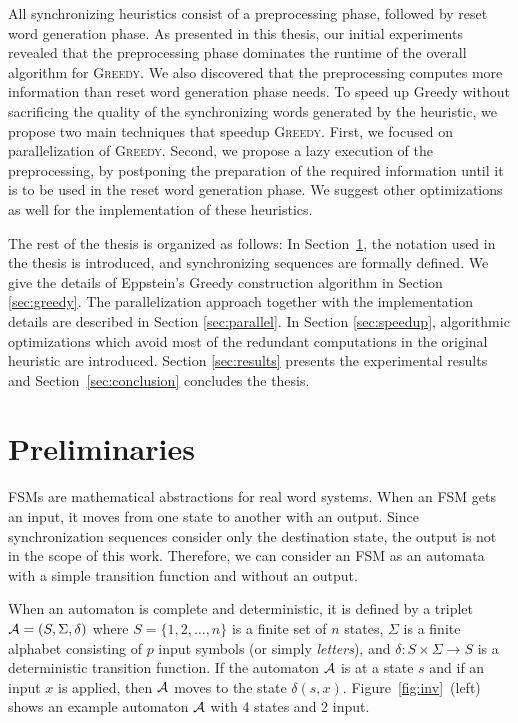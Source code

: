 \documentclass[12pt]{article}
\newcommand{\greedyAlgo}{\textsc{Greedy}}
\begin{document}
All synchronizing heuristics consist of a preprocessing phase, followed by reset word generation phase. As presented in this thesis, our initial experiments revealed that the preprocessing phase dominates the runtime of the overall algorithm for \textsc{Greedy}. We also discovered that the preprocessing computes more information than reset word generation phase needs.  To speed up Greedy without sacrificing the
quality of the synchronizing words generated by the heuristic, we propose two main techniques that speedup \greedyAlgo . First, we focused on parallelization of \textsc{Greedy}. Second, we propose a lazy execution of the preprocessing, by postponing the preparation of the required information until it is to be used in the reset word generation phase. We suggest other optimizations as well for the implementation of these heuristics. 

The rest of the thesis is organized as follows: In Section~\ref{sec:Preliminaries}, the notation used in the thesis is introduced, and synchronizing sequences are formally defined. We give the details of Eppstein's {\sc Greedy} construction algorithm in Section \ref{sec:greedy}. The parallelization approach together with the implementation details are described in Section \ref{sec:parallel}. In Section \ref{sec:speedup}, algorithmic optimizations which avoid most of the redundant computations in the original heuristic are introduced. Section \ref{sec:results} presents the experimental results and Section~\ref{sec:conclusion} concludes the thesis.

\clearpage
\section{Preliminaries}
\label{sec:Preliminaries}
FSMs are mathematical abstractions for real word systems. When an FSM gets an input, it moves from one state to another with an output. Since synchronization sequences consider only the destination state, the output is not in the scope of this work. Therefore, we can consider an FSM as an automata with a simple transition function and without an output.

When an automaton is complete and deterministic, it is defined by a triplet ${\cal A}=(S, \Sigma, \delta)$  where $S = \{1, 2, \ldots, n\}$ is a finite set of $n$ states, $\Sigma$ is a finite alphabet consisting of $p$ input symbols (or simply {\em letters}), and $\delta : S \times \Sigma \rightarrow S$ is a deterministic transition function. If the automaton ${\cal A}$ is at a state $s$ and if an input $x$ is applied, then ${\cal A}$ moves to the state $\delta(s,x)$. Figure~\ref{fig:inv}~(left) shows an example automaton ${\cal A}$ with 4 states and 2 input.
\end{document}
